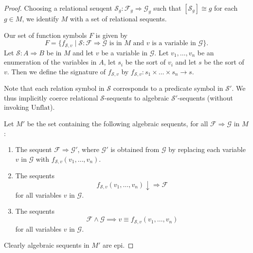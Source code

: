\documentclass[a4paper]{article}
\theoremstyle{remark}
\theoremstyle{definition}
\begin{document}
\begin{proof}
  Choosing a relational seuqent $\mathcal{S}_g : \mathcal{F}_g \Rightarrow \mathcal{G}_g$ such that $[\mathcal{S}_g] \cong g$ for each $g \in M$, we identify $M$ with a set of relational sequents.

  Our set of function symbols $F$ is given by
  \begin{equation}
    F = \{ f_{\mathcal{S}, v} \mid \mathcal{S} : \mathcal{F} \Rightarrow \mathcal{G} \text{ is in } M \text{ and } v \text{ is a variable in } \mathcal{G} \}.
  \end{equation}
  Let $\mathcal{S} : A \Rightarrow B$ be in $M$ and let $v$ be a variable in $\mathcal{G}$.
  Let $v_1, \dots, v_n$ be an enumeration of the variables in $A$, let $s_i$ be the sort of $v_i$ and let $s$ be the sort of $v$.
  Then we define the signature of $f_{\mathcal{S}, v}$ by $f_{\mathcal{S}, v} : s_1 \times \dots \times s_n \rightarrow s$.

  Note that each relation symbol in $\mathcal{S}$ corresponds to a predicate symbol in $\mathcal{S}'$.
  We thus implicitly coerce relational $\mathcal{S}$-sequents to algebraic $\mathcal{S}'$-sequents (without invoking $\mathrm{Unflat}$).

  Let $M'$ be the set containing the following algebraic sequents, for all $\mathcal{F} \Rightarrow \mathcal{G}$ in $M$:
  \begin{enumerate}
    \item
      \label{itm:new-functions-satisfy}
      The sequent $\mathcal{F} \Rightarrow \mathcal{G}'$, where $\mathcal{G}'$ is obtained from $\mathcal{G}$ by replacing each variable $v$ in $\mathcal{G}$ with $f_{\mathcal{S}, v}(v_1, \dots, v_n)$.
    \item
      \label{itm:new-functions-only-defined-if-premise}
      The sequents
      \begin{equation}
        f_{\mathcal{S}, v}(v_1, \dots, v_n) \downarrow \Rightarrow \mathcal{F}
      \end{equation}
      for all variables $v$ in $\mathcal{G}$.
    \item
      \label{itm:new-functions-uniquely}
      The sequents
      \begin{equation}
        \mathcal{F} \land \mathcal{G} \implies v \equiv f_{\mathcal{S}, v}(v_1, \dots, v_n)
      \end{equation}
      for all variables $v$ in $\mathcal{G}$.
  \end{enumerate}
  Clearly algebraic sequents in $M'$ are epi.


\end{proof}
\end{document}
